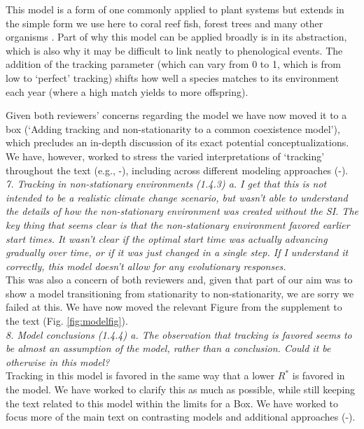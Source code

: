 \documentclass[11pt]{article}
\begin{document}
This model is a form of one commonly applied to plant systems but extends in the simple form we use here to coral reef fish, forest trees and many other organisms \citep[see][]{Chesson:1997dz}. Part of why this model can be applied broadly is in its abstraction, which is also why it may be difficult to link neatly to phenological events. The addition of the tracking parameter (which can vary from 0 to 1, which is from low to `perfect' tracking) shifts how well a species matches to its environment each year (where a high match yields to more offspring). 

Given both reviewers' concerns regarding the model we have now moved it to a box (`Adding tracking and non-stationarity to a common coexistence model'), which precludes an in-depth discussion of its exact potential conceptualizations. We have, however, worked to stress the varied interpretations of `tracking' throughout the text (e.g., -), including across different modeling approaches (-).\\

\emph{7.      Tracking in non-stationary environments (1.4.3)
a.      I get that this is not intended to be a realistic climate change scenario, but wasn't
able to understand the details of how the non-stationary environment was created without the
SI. The key thing that seems clear is that the non-stationary environment favored earlier
start times. It wasn't clear if the optimal start time was actually advancing gradually over
time, or if it was just changed in a single step. If I understand it correctly, this model
doesn't allow for any evolutionary responses.}\\

This was also a concern of both reviewers and, given that part of our aim was to show a model transitioning from stationarity to non-stationarity, we are sorry we failed at this. We have now moved the relevant Figure from the supplement to the text (Fig. \ref{fig:modelfig}). \\

\emph{8.      Model conclusions (1.4.4)
a.      The observation that tracking is favored seems to be almost an assumption of the
model, rather than a conclusion. Could it be otherwise in this model?}\\

Tracking in this model is favored in the same way that a lower $R^*$ is favored in the model. We have worked to clarify this as much as possible, while still keeping the text related to this model within the limits for a Box. We have worked to focus more of the main text on contrasting models and additional approaches (-).\\
\end{document}
